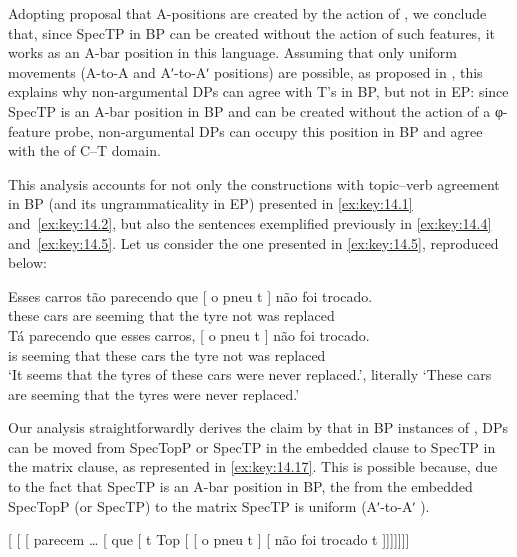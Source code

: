 \documentclass[output=paper]{langsci/langscibook}
\begin{document}
Adopting  proposal that A-positions are created by the
action of , we conclude that, since SpecTP in \gls{BP} can be
created without the action of such features, it works as an A-bar position in
this language. Assuming that only uniform movements (A-to-A and Aʹ-to-Aʹ
positions) are possible, as proposed in \citet{Chomsky2008}, this explains why
non-argumental DPs can agree with T’s  in BP, but not in EP: since
SpecTP is an A-bar position in \gls{BP} and can be created without the action
of a φ-feature probe, non-argumental DPs can occupy this position in \gls{BP}
and agree with the  of C--T domain.

This analysis accounts for not only the constructions with topic--verb
agreement in \gls{BP} (and its ungrammaticality in EP) presented in
\eqref{ex:key:14.1} and~\eqref{ex:key:14.2}, but also the 
sentences exemplified previously in \eqref{ex:key:14.4}
and~\eqref{ex:key:14.5}. Let us consider the one presented in
\eqref{ex:key:14.5}, reproduced below:

\ea\label{ex:key:14.16}
    \ea
	\gll    Esses carros tão parecendo que [ o pneu t ] não foi trocado.\\
    these cars are seeming that {} the tyre {} {} not was replaced\\
    \ex
    \gll    Tá parecendo que esses carros, [ o pneu t ] não foi trocado.\\
    is seeming that these cars {} the tyre {} {} not was replaced\\
    \glt    ‘It seems that the tyres of these cars were never replaced.’,
            literally ‘These cars are seeming that the tyres were never replaced.’
    \z
\z

Our analysis straightforwardly derives the claim by \citet{NunesMartins2010}
that in \gls{BP} instances of , DPs can be moved from SpecTopP
or SpecTP in the embedded clause to SpecTP in the matrix clause, as
represented in \eqref{ex:key:14.17}. This is possible because, due to the fact that
SpecTP is an A-bar position in BP, the  from the embedded SpecTopP
(or SpecTP) to the matrix SpecTP is uniform (Aʹ-to-Aʹ ).

\ea\label{ex:key:14.17}
    {}[ [ [ parecem \dots{} [ que [
    t Top [ [ o pneu t ] [ não foi
    trocado t ]]]]]]]
\z
\end{document}
